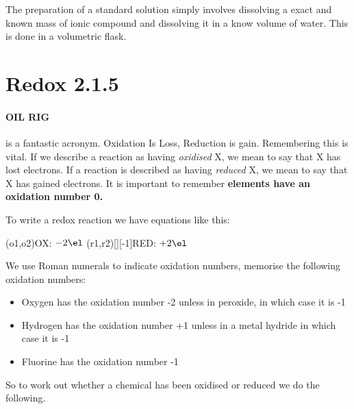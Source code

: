 	
	The preparation of a standard solution simply involves dissolving a exact and known mass of ionic compound and dissolving it in a know volume of water.
	This is done in a volumetric flask.
    \section{Redox 2.1.5}

	\paragraph{OIL RIG} is a fantastic acronym.
	Oxidation Is Loss, Reduction is gain.
	Remembering this is vital.
	If we describe a reaction as having \textit{oxidised} X, we mean to say that X has lost electrons.
	If a reaction is described as having \textit{reduced} X, we mean to say that X has gained electrons. It is important to remember \textbf{elements have an oxidation number 0.}
	
	To write a redox reaction we have equations like this:
	\begin{center}
	\vspace{7mm}
	\redox(o1,o2){\small OX: $- 2\el$}
	\redox(r1,r2)[][-1]{\small RED: $+ 2\el$}
	\vspace{7mm}
	\end{center}
	We use Roman numerals to indicate oxidation numbers, memorise the following oxidation numbers:
	\begin{itemize}
		\item Oxygen has the oxidation number -2 unless in peroxide, in which case it is -1
		\item Hydrogen has the oxidation number +1 unless in a metal hydride in which case it is -1
		\item Fluorine has the oxidation number -1
	\end{itemize}
	So to work out whether a chemical has been oxidised or reduced we do the following.
	
